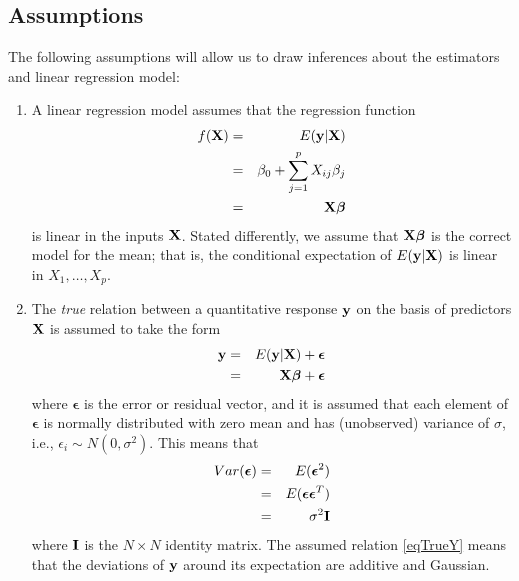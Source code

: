 \documentclass[11pt]{article}
\theoremstyle{remark}
\begin{document}
\subsection{Assumptions}
The following assumptions will allow us to draw inferences about the estimators and linear regression model:
\begin{enumerate}
\item A linear regression model assumes that the regression function
\begin{eqnarray}
f(\bold{X}) &=& E(\bold{y}|\bold{X})\nonumber\\
&=& \beta_0 + \sum_{j=1}^p X_{ij}\beta_j\nonumber\\
&=& \bold{X}\boldsymbol{\beta}\label{eqLinearRegressionFunction}
\end{eqnarray}
is linear in the inputs $\bold{X}$. Stated differently, we assume that $\bold{X}\boldsymbol{\beta}$ is the correct model for the mean; that is, the conditional expectation of $E(\bold{y}|\bold{X})$ is linear in $X_1,\hdots,X_p$.
\item The \emph{true} relation between a quantitative response $\bold{y}$ on the basis of predictors $\bold{X}$ is assumed to take the form
\begin{eqnarray}
\bold{y} &=& E(\bold{y}|\bold{X}) + \boldsymbol{\epsilon}\nonumber\\
&=& \bold{X}\boldsymbol{\beta} + \boldsymbol{\epsilon}\label{eqTrueY}
\end{eqnarray}
where $\boldsymbol{\epsilon}$ is the error or residual vector, and it is assumed that each element of $\boldsymbol{\epsilon}$ is normally distributed with zero mean and has (unobserved) variance of $\sigma$, i.e., $\epsilon_i \sim N(0,\sigma^2)$. This means that
\begin{eqnarray}
Var(\boldsymbol{\epsilon}) &=& E(\boldsymbol{\epsilon}^2)\nonumber\\
&=& E(\boldsymbol{\epsilon}\boldsymbol{\epsilon}^T)\nonumber\\
&=& \sigma^2\bold{I}\label{VarError}
\end{eqnarray}
where $\bold{I}$ is the $N \times N$ identity matrix. The assumed relation \eqref{eqTrueY} means that the deviations of $\bold{y}$ around its expectation are additive and Gaussian.
\end{enumerate}
\end{document}
